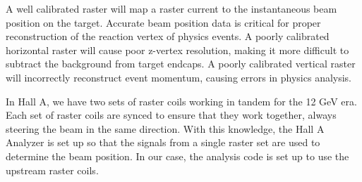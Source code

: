 A well calibrated raster will map a raster current to the instantaneous beam position on the target. Accurate beam position data is critical for proper reconstruction of the reaction vertex of physics events. A poorly calibrated horizontal raster will cause poor z-vertex resolution, making it more difficult to subtract the background from target endcaps. A poorly calibrated vertical raster will incorrectly reconstruct event momentum, causing errors in physics analysis.

In Hall A, we have two sets of raster coils working in tandem for the 12 GeV era. Each set of raster coils are synced to ensure that they work together, always steering the beam in the same direction. With this knowledge, the Hall A Analyzer is set up so that the signals from a single raster set are used to determine the beam position. In our case, the analysis code is set up to use the upstream raster coils.

